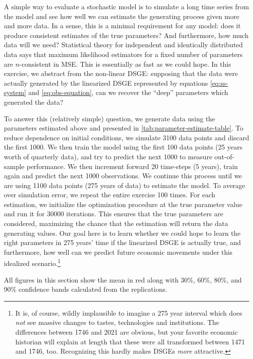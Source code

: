\documentclass[11pt]{article}
\begin{document}
A simple way to evaluate a stochastic model is to simulate a long time
series from the model and see how well we can estimate the generating
process given more and more data. In a sense, this is a minimal
requirement for any model: does it produce consistent estimates of the
true parameters? And furthermore, how much data will we need?
Statistical theory for independent and identically distributed data says
that maximum likelihood estimators for a fixed number of parameters are
\(n\)-consistent in MSE. This is essentially as fast as we could hope.
In this exercise, we abstract from the non-linear DSGE: supposing that
the data were actually generated by the linearized DSGE represented by
equations \eqref{eq:ss-system} and \eqref{eq:obs-equation}, can we
recover the ``deep'' parameters which generated the data?

To answer this (relatively simple) question, we generate data using the
parameters estimated above and presented in
\autoref{tab:parameter-estimate-table}. To reduce dependence on initial
conditions, we simulate 3100 data points and discard the first 1000. We
then train the model using the first 100 data points (25 years worth of
quarterly data), and try to predict the next 1000 to measure
out-of-sample performance. We then increment forward 20 time-steps (5
years), train again and predict the next 1000 observations. We continue
this process until we are using 1100 data points (275 years of data) to
estimate the model. To average over simulation error, we repeat the
entire exercise 100 times. For each estimation, we initialize the
optimization procedure at the true parameter value and run it for 30000
iterations. This ensures that the true parameters are considered,
maximizing the chance that the estimation will return the data
generating values. Our goal here is to learn whether we could hope to
learn the right parameters in 275 years' time if the linearized DSGE is
actually true, and furthermore, how well can we predict future economic
movements under this idealized scenario.\footnote{It is, of course,
  wildly implausible to imagine a 275 year interval which does
  \emph{not} see massive changes to tastes, technologies and
  institutions. The differences between 1746 and 2021 are obvious, but
  your favorite economic historian will explain at length that these
  were all transformed between 1471 and 1746, too. Recognizing this
  hardly makes DSGEs \emph{more} attractive.}

All figures in this section show the mean in red along with 30\%, 60\%,
80\%, and 90\% confidence bands calculated from the replications.
\end{document}
